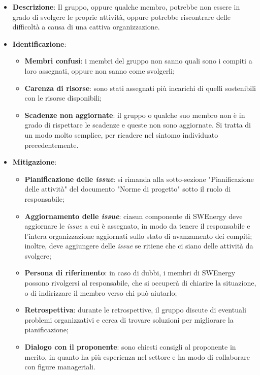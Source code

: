 \label{risk:organizzazione carente}
\begin{itemize}
	\item \textbf{Descrizione}:
	      Il gruppo, oppure qualche membro, potrebbe non essere in grado di
	      svolgere le proprie attività, oppure potrebbe riscontrare delle
	      difficoltà a causa di una cattiva organizzazione.
	\item \textbf{Identificazione}:
	      \begin{itemize}
		      \item \textbf{Membri confusi}: i membri del gruppo non sanno quali
		            sono i compiti a loro assegnati, oppure non sanno come
		            svolgerli;

		      \item \textbf{Carenza di risorse}: sono stati assegnati più
		            incarichi di quelli sostenibili con le risorse disponibili;

		      \item \textbf{Scadenze non aggiornate}: il gruppo o qualche suo
		            membro non è in grado di rispettare le scadenze e queste non
		            sono aggiornate. Si tratta di un modo molto semplice, per
		            ricadere nel sintomo individuato precedentemente.
	      \end{itemize}

	\item \textbf{Mitigazione}:
	      \begin{itemize}
		      \item \textbf{Pianificazione delle \textit{issue}}: si rimanda
		            alla sotto-sezione "Pianificazione delle attività" del
		            documento "Norme di progetto" sotto il ruolo di
		            responsabile;

		      \item \textbf{Aggiornamento delle \textit{issue}}:
		            ciasun componente di SWEnergy deve aggiornare le
		            \textit{issue} a cui è assegnato, in modo da tenere il
		            responsabile e l'intera organizzazione aggiornati sullo
		            stato di avanzamento dei compiti; inoltre, deve aggiungere
		            delle \textit{issue} se ritiene che ci siano delle attività
		            da svolgere;

		      \item \textbf{Persona di riferimento}: in caso di dubbi, i
		            membri di SWEnergy possono rivolgersi
		            al responsabile, che si occuperà di chiarire la situazione,
		            o di indirizzare il membro verso chi può aiutarlo;

		      \item \textbf{Retrospettiva}: durante le retrospettive, il gruppo
		            discute di eventuali problemi organizzativi e cerca di
		            trovare soluzioni per migliorare la pianificazione;

		      \item \textbf{Dialogo con il proponente}: sono chiesti consigli al
		            proponente in merito, in quanto ha più esperienza
		            nel settore e ha modo di collaborare con figure manageriali.
	      \end{itemize}
\end{itemize}
